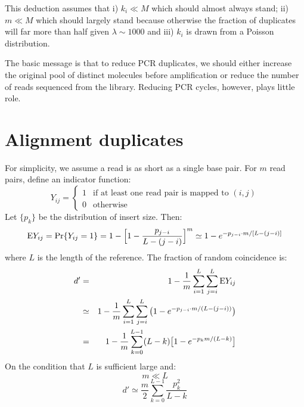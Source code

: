 \documentclass[pdftex,10pt]{book}
\begin{document}
This deduction assumes that i) $k_i\ll M$ which should almost always
stand; ii) $m\ll M$ which should largely stand because otherwise the
fraction of duplicates will far more than half given $\lambda\sim 1000$
and iii) $k_i$ is drawn from a Poisson distribution.

The basic message is that to reduce PCR duplicates, we should either
increase the original pool of distinct molecules before amplification or
reduce the number of reads sequenced from the library. Reducing PCR
cycles, however, plays little role.

\section{Alignment duplicates}

For simplicity, we assume a read is as short as a single base pair. For
$m$ read pairs, define an indicator function:
\begin{equation*}
  Y_{ij}=\left\{\begin{array}{ll}
      1 & \mbox{if at least one read pair is mapped to $(i,j)$} \\
      0 & \mbox{otherwise}
    \end{array}\right.
\end{equation*}
Let $\{p_k\}$ be the distribution of insert size. Then:
\begin{equation*}
  {\rm E}Y_{ij}=\Pr\{Y_{ij}=1\}=1-\Big[1-\frac{p_{j-i}}{L-(j-i)}\Big]^m\simeq 1-e^{-p_{j-i}\cdot m/[L-(j-i)]}
\end{equation*}
where $L$ is the length of the reference. The fraction of random
coincidence is:
\begin{eqnarray*}
  d'&=&1-\frac{1}{m}\sum_{i=1}^L\sum_{j=i}^L{\rm E}Y_{ij}\\
  &\simeq&1-\frac{1}{m}\sum_{i=1}^L\sum_{j=i}^L\big(1-e^{-p_{j-i}\cdot m/(L-(j-i))}\big)\\
  &=&1-\frac{1}{m}\sum_{k=0}^{L-1}(L-k)\big[1-e^{-p_k m/(L-k)}\big]
\end{eqnarray*}
On the condition that $L$ is sufficient large and:
\begin{equation}
  m\ll L
\end{equation}
\begin{equation}\label{equ:dd}
  d'\simeq\frac{m}{2}\sum_{k=0}^{L-1}\frac{p_k^2}{L-k}
\end{equation}
\end{document}
